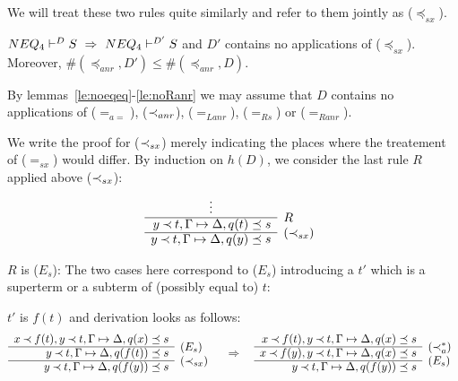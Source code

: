 We will treat these two rules quite similarly and refer to them jointly as ($\preceq_{sx}$).
\begin{LEMMA}\label{le:noInclsx}
 ${NEQ_4}\vdash^{{D}}S\ \mathrel\Rightarrow\ {NEQ_4}\vdash^{{D'}}S$ and $D'$ contains no applications
 of ($\preceq_{sx}$). Moreover, $\#(\preceq_{anr},D')\leq\#(\preceq_{anr},D)$.
\end{LEMMA}
\begin{PROOF}
By lemmas~\ref{le:noeqeq}-\ref{le:noRanr} we may assume that $D$ contains no
applications of ($=_{a=}$), ($\mathbin{\prec}_{anr}$), ($=_{Lanr}$), ($=_{Rs}$) or ($=_{Ranr}$).

We write the proof for ($\mathbin{\prec}_{sx}$) merely indicating the places where the
treatement of ($=_{sx}$) would differ.
By induction on $h(D)$, we consider the last rule $R$ applied above
($\mathbin{\prec}_{sx}$):
\[ \begin{array}{rl}
\multicolumn{1}{c}{\vdots} \\ \cline{1-1}
y\Incl t, \GSD, q(t)\preceq s & \rabove{R}\\ \cline{1-1}
y\Incl t, \GSD, q(y)\preceq s & \rabove{(\Incl_{sx})}
\end{array} \]
\begin{LS}
\item $R$ is ($E_s$):
The two cases here correspond to ($E_s$) introducing a $t'$ which is a superterm or a
subterm of (possibly equal to) $t$:
 \begin{LSA}
 \item $t'$ is $f(t)$ and derivation looks as follows:
\[ \begin{array}{rl}
  x\Incl f(t), y\Incl t, \GSD, q(x)\preceq s \\ \cline{1-1}
               y\Incl t, \GSD, q(f(t))\preceq s & \rabove{(E_s)} \\ \cline{1-1}
               y\Incl t, \GSD, q(f(y))\preceq s & \rabove{(\Incl_{sx})} 
\end{array} 
\conv
\begin{array}{rl}
  x\Incl f(t), y\Incl t, \GSD, q(x)\preceq s \\ \cline{1-1}
  x\Incl f(y), y\Incl t, \GSD, q(x)\preceq s & \rabove{(\Incl_a^*)} \\ \cline{1-1}
               y\Incl t, \GSD, q(f(y))\preceq s & \rabove{(E_s)} 
\end{array}
\]

\end{LSA}
\end{LS}
\end{PROOF}
